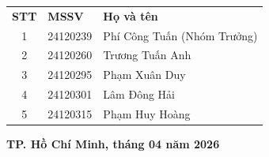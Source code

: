 \begin{center}
{\begin{minipage}{0.95\textwidth}
\begin{center}
                \renewcommand{\arraystretch}{1.2}
                \begin{tabular}{ c  l  l }
                    \textbf{STT} & \textbf{MSSV} & \textbf{Họ và tên} \\
                    1 & 24120239 & Phí Công Tuấn (Nhóm Trưởng) \\
                    2 & 24120260 & Trương Tuấn Anh \\
                    3 & 24120295 & Phạm Xuân Duy \\
                    4 & 24120301 & Lâm Đông Hải \\
                    5 & 24120315 & Phạm Huy Hoàng \\
                \end{tabular}

                \vspace{4em} %
                \textbf{TP. Hồ Chí Minh, tháng 04 năm 2026}
                \vspace{1.5em} %
            \end{center}
        \end{minipage}
    }
\end{center}